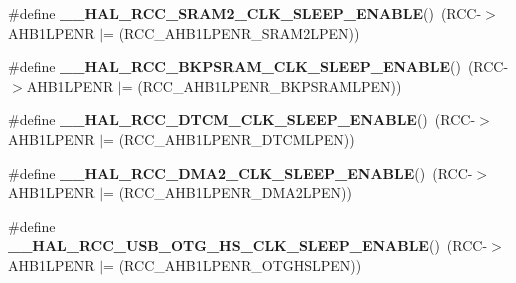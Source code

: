 \begin{DoxyCompactItemize}
\item 
\mbox{\label{group___r_c_c_ex___peripheral___clock___sleep___enable___disable_ga485ced56558657be69e01a48e5d62f6d}} 
\#define {\bfseries \+\_\+\+\_\+\+H\+A\+L\+\_\+\+R\+C\+C\+\_\+\+S\+R\+A\+M2\+\_\+\+C\+L\+K\+\_\+\+S\+L\+E\+E\+P\+\_\+\+E\+N\+A\+B\+LE}()~(R\+CC-\/$>$A\+H\+B1\+L\+P\+E\+NR $\vert$= (R\+C\+C\+\_\+\+A\+H\+B1\+L\+P\+E\+N\+R\+\_\+\+S\+R\+A\+M2\+L\+P\+EN))
\item 
\mbox{\label{group___r_c_c_ex___peripheral___clock___sleep___enable___disable_gaa68382ab65f37deee2b43712fd819ace}} 
\#define {\bfseries \+\_\+\+\_\+\+H\+A\+L\+\_\+\+R\+C\+C\+\_\+\+B\+K\+P\+S\+R\+A\+M\+\_\+\+C\+L\+K\+\_\+\+S\+L\+E\+E\+P\+\_\+\+E\+N\+A\+B\+LE}()~(R\+CC-\/$>$A\+H\+B1\+L\+P\+E\+NR $\vert$= (R\+C\+C\+\_\+\+A\+H\+B1\+L\+P\+E\+N\+R\+\_\+\+B\+K\+P\+S\+R\+A\+M\+L\+P\+EN))
\item 
\mbox{\label{group___r_c_c_ex___peripheral___clock___sleep___enable___disable_ga50a59244cf0d43211057b36b2138fadc}} 
\#define {\bfseries \+\_\+\+\_\+\+H\+A\+L\+\_\+\+R\+C\+C\+\_\+\+D\+T\+C\+M\+\_\+\+C\+L\+K\+\_\+\+S\+L\+E\+E\+P\+\_\+\+E\+N\+A\+B\+LE}()~(R\+CC-\/$>$A\+H\+B1\+L\+P\+E\+NR $\vert$= (R\+C\+C\+\_\+\+A\+H\+B1\+L\+P\+E\+N\+R\+\_\+\+D\+T\+C\+M\+L\+P\+EN))
\item 
\mbox{\label{group___r_c_c_ex___peripheral___clock___sleep___enable___disable_ga16c048816a705de87bb5fd3ce4003a82}} 
\#define {\bfseries \+\_\+\+\_\+\+H\+A\+L\+\_\+\+R\+C\+C\+\_\+\+D\+M\+A2\+\_\+\+C\+L\+K\+\_\+\+S\+L\+E\+E\+P\+\_\+\+E\+N\+A\+B\+LE}()~(R\+CC-\/$>$A\+H\+B1\+L\+P\+E\+NR $\vert$= (R\+C\+C\+\_\+\+A\+H\+B1\+L\+P\+E\+N\+R\+\_\+\+D\+M\+A2\+L\+P\+EN))
\item 
\mbox{\label{group___r_c_c_ex___peripheral___clock___sleep___enable___disable_gabb43476c09deccb66a55a2fbdc2176cd}} 
\#define {\bfseries \+\_\+\+\_\+\+H\+A\+L\+\_\+\+R\+C\+C\+\_\+\+U\+S\+B\+\_\+\+O\+T\+G\+\_\+\+H\+S\+\_\+\+C\+L\+K\+\_\+\+S\+L\+E\+E\+P\+\_\+\+E\+N\+A\+B\+LE}()~(R\+CC-\/$>$A\+H\+B1\+L\+P\+E\+NR $\vert$= (R\+C\+C\+\_\+\+A\+H\+B1\+L\+P\+E\+N\+R\+\_\+\+O\+T\+G\+H\+S\+L\+P\+EN))

\end{DoxyCompactItemize}
